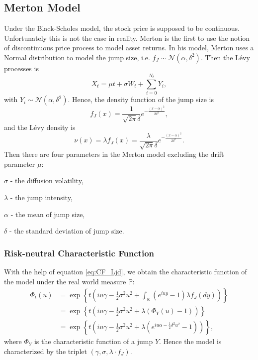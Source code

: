 \subsection{Merton Model}
Under the Black-Scholes model, the stock price is supposed to be continuous. Unfortunately this is not the case in reality. Merton \citeyearpar{Mer76} is the first to use the notion of discontinuous price process to model asset returns. In his model, Merton uses a Normal distribution to model the jump size, i.e. $f_J\sim \mathcal{N}(\alpha,\delta^2)$. Then the L\'evy processes is
$$X_t = \mu t +\sigma W_t +\sum_{i=0}^{N_t} Y_i,$$
with $Y_i\sim \mathcal{N}(\alpha,\delta^2)$. Hence, the density function of the jump size is
$$f_J(x) = \frac{1}{\sqrt{2\pi}\delta}e^{-\frac{(x-\alpha)^2}{2\delta^2}},$$
and the L\'evy density is
$$\nu(x) = \lambda f_J(x) = \frac{\lambda}{\sqrt{2\pi}\delta}e^{-\frac{(x-\alpha)^2}{2\delta^2}}.$$
Then there are four parameters in the Merton model excluding the drift parameter $\mu$:
\begin{my_list_item}
\item $\sigma$ - the diffusion volatility, 
\item $\lambda$ - the jump intensity,
\item $\alpha$ - the mean of jump size,
\item $\delta$ - the standard deviation of jump size.
\end{my_list_item}

\subsubsection*{Risk-neutral Characteristic Function}
With the help of equation \ref{eq:CF_Ljd}, we obtain the characteristic function of the model under the real world measure $\mathbb{P}$:
\begin{align*}
\Phi_t(u) &= \exp\left\{t\left(iu\gamma -\frac{1}{2}\sigma^2 u^2 + \int_\mathbb{R}\left(e^{iuy}-1\right)\lambda f_J(dy)\right)\right\}\\
&= \exp\left\{t\left(iu\gamma - \frac{1}{2}\sigma^2 u^2 + \lambda\left( \Phi_Y(u)-1\right)\right)\right\}\\
&= \exp\left\{t\left(iu\gamma - \frac{1}{2}\sigma^2 u^2 + \lambda\left( e^{iu\alpha - \frac{1}{2}\delta^2 u^2}-1\right)\right)\right\},
\end{align*}
where $\Phi_Y$ is the characteristic function of a jump $Y$. Hence the model is characterized by the triplet $(\gamma,\sigma,\lambda \cdot f_J)$.

